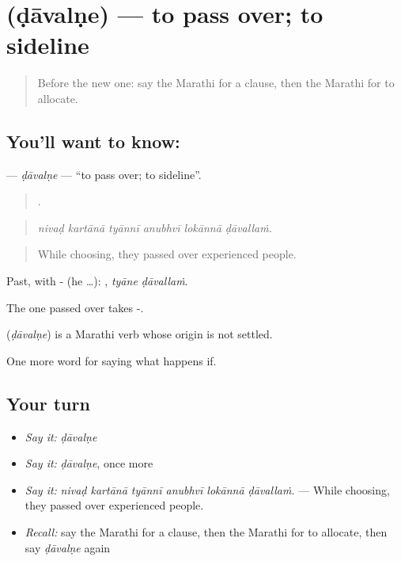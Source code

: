 \section[\texorpdfstring{\mr{डावलणे} (ḍāvalṇe)}{डावलणे (ḍāvalṇe)}]{ (ḍāvalṇe) — to pass over; to sideline}

\label{lesson:MR-C392-davalne}



\begin{quote}
Before the new one: say the Marathi for a clause, then the Marathi for to allocate.
\end{quote}

\subsection*{You'll want to know: }
\textbf{} — \emph{ḍāvalṇe} — \textquotedblleft{}to pass over; to sideline\textquotedblright{}.

\begin{quote}
     .
\end{quote}

\begin{quote}
\emph{nivaḍ kartānā tyānnī anubhvī lokānnā ḍāvallaṁ.}
\end{quote}

\begin{quote}
While choosing, they passed over experienced people.
\end{quote}

Past, with - (he …):  , \emph{tyāne ḍāvallaṁ}.

The one passed over takes -.

\begin{cousinweb}
\textbf{} (\emph{ḍāvalṇe}) is a Marathi verb whose origin is not settled.
\end{cousinweb}

\begin{grammarlens}[title={What you've built}]
One more word for saying what happens if.
\end{grammarlens}

\subsection*{Your turn}
\begin{itemize}
\raggedright
  \item \emph{Say it:} \emph{ḍāvalṇe}
  \item \emph{Say it:} \emph{ḍāvalṇe}, once more
  \item \emph{Say it:} \emph{nivaḍ kartānā tyānnī anubhvī lokānnā ḍāvallaṁ.} — While choosing, they passed over experienced people.
  \item \emph{Recall:} say the Marathi for a clause, then the Marathi for to allocate, then say \emph{ḍāvalṇe} again
\end{itemize}

